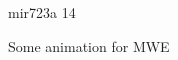\documentclass[12pt,letterpaper,oneside,titlepage]{article}
\begin{document}
\begin{landscape}
\begin{figure}[h]
\begin{center}
%
{mir723a}%
{1}{4}%
\end{center}
 \caption{Some animation for MWE}
\end{figure}
\end{landscape}

\end{document}
